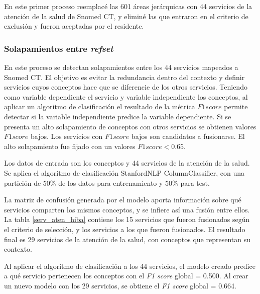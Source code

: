 En este primer proceso reemplacé las 601 áreas jerárquicas con 44 servicios de la atención de la salud de Snomed CT, y eliminé las que entraron en el criterio de exclusión y fueron aceptadas por el residente. 

\subsubsection{Solapamientos entre \textit{refset}}
En este proceso se detectan solapamientos entre los 44 servicios mapeados a Snomed CT. El objetivo es evitar la redundancia dentro del contexto y definir servicios cuyos conceptos hace que se diferencie de los otros servicios. Teniendo como variable dependiente el servicio y variable independiente los conceptos, al aplicar un algoritmo de clasificación el resultado de la métrica $F1 score$ permite detectar si la variable independiente predice la variable dependiente.  Si se presenta un alto solapamiento de conceptos con otros servicios se obtienen valores  $F1 score$ bajos. Los servicios con  $F1 score$ bajos son candidatos a fusionarse. El alto solapamiento fue fijado con un valores $F1 score < 0.65$.

Los datos de entrada son los conceptos y 44  servicios de la atención de la salud. Se aplica el algoritmo de clasificación StanfordNLP ColumnClassifier, con  una partición de 50\% de los datos para  entrenamiento y 50\% para test.
 
 La matriz de confusión generada por el modelo aporta información sobre qué servicios comparten los mismos conceptos, y se infiere así una fusión entre ellos. La tabla \ref{serv_aten_hiba} contiene los 15 servicios que fueron fusionados según el criterio de selección, y los servicios a los que fueron fusionados.  El resultado final es 29 servicios de la atención de la salud, con conceptos que representan su contexto.
 
Al aplicar el algoritmo de clasificación a los 44 servicios, el modelo creado predice a qué servicio pertenecen los conceptos con el \textit{F1 score} global = 0.500.  Al crear un nuevo modelo con los 29 servicios, se obtiene el   \textit{F1 score}  global = 0.664.

